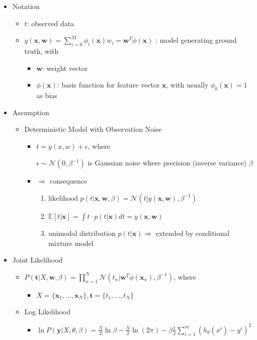 \begin{itemize}

\item Notation
	\begin{itemize}
	\item $t$: observed data
	\item $\displaystyle y(\mathbf x,\mathbf w)=\sum_{i=0}^{M}\phi_i(\mathbf x)w_i = \mathbf w^T \phi(\mathbf x)$ : model generating ground truth, with
		\begin{itemize}
		\item $\mathbf w$: weight vector
		\item $\phi(\mathbf x)$: basis function for feature vector $\mathbf x$, with usually $\phi_0(\mathbf x) = 1$ as bias
		\end{itemize}
	\end{itemize}

\item Assumption
	\begin{itemize}
	\item Deterministic Model with Observation Noise
		\begin{itemize}
		\item \(t=y(x,w)+\epsilon\), where
		
		$\epsilon \sim \mathcal N(0,\beta^{-1})$ is Gaussian noise where precision (inverse variance) $\beta$
		\item $\Rightarrow$ consequence
			\begin{enumerate}
			\item $\text{likelihood } p(t|\mathbf x,\mathbf w,\beta) = \mathcal N(t|y(\mathbf x,\mathbf w), \beta^{-1})$
			\item $\mathbb E[t|\mathbf x] = \int t\cdot p(t|\mathbf x) dt = y(\mathbf x, \mathbf w) $
			\item unimodal distribution $p(t|\mathbf x) \Rightarrow$ extended by conditional mixture model
			\end{enumerate}

		\end{itemize}
	\end{itemize}

\item Joint Likelihood

	\begin{itemize}
	\item $\displaystyle P(\mathbf t| X,\mathbf w,\beta) = \prod_{n=1}^N \mathcal N(t_n|\mathbf w ^T\phi(\mathbf x_n), \beta^{-1})$, where
		\begin{itemize}
		\item $X = \{ \mathbf x_1,...,\mathbf x_N \}, \mathbf t = \{ t_1,...,t_N \}$
		\end{itemize}
	\item Log Likelihood 
		\begin{itemize}
			\item $\displaystyle \ln P(\boldsymbol y|X,\theta,\beta) = \frac N 2\ln\beta - \frac N 2 \ln(2\pi) - \beta \frac 1 2\sum_{i=1}^m (h_\theta(x^i) - y^i)^2$
		\end{itemize}
	 

\end{itemize}
\end{itemize}
